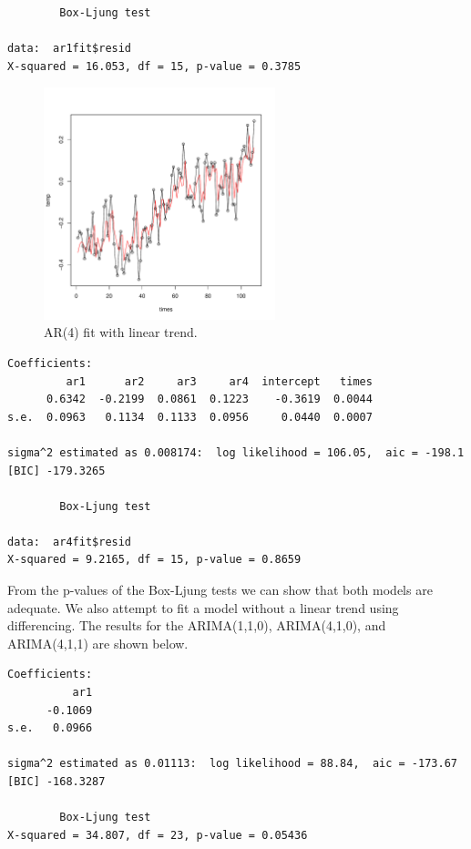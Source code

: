 \documentclass[12pt]{article}
\newenvironment{solution}[2][Solution]{\begin{trivlist}
	\item[\hskip \labelsep {\bfseries #1}]}{\end{trivlist}}
\begin{document}
\begin{solution}{}
\begin{lstlisting}
        Box-Ljung test

data:  ar1fit$resid
X-squared = 16.053, df = 15, p-value = 0.3785
	\end{lstlisting}
	
	\begin{figure}[H]
    		\centering
    		\includegraphics[width=0.6\textwidth]{figs/problem_6/temp_ar4_lin.pdf}
    		\caption{AR(4) fit with linear trend.}
    		\label{fig:temp_ar4_lin}
	\end{figure}
	
	
		\begin{lstlisting}
Coefficients:
         ar1      ar2     ar3     ar4  intercept   times
      0.6342  -0.2199  0.0861  0.1223    -0.3619  0.0044
s.e.  0.0963   0.1134  0.1133  0.0956     0.0440  0.0007

sigma^2 estimated as 0.008174:  log likelihood = 106.05,  aic = -198.1
[BIC] -179.3265

        Box-Ljung test

data:  ar4fit$resid
X-squared = 9.2165, df = 15, p-value = 0.8659
	\end{lstlisting}
	
	From the p-values of the Box-Ljung tests we can show that both models are adequate. We also attempt to fit a model without a linear trend using differencing. The results for the ARIMA(1,1,0), ARIMA(4,1,0), and ARIMA(4,1,1) are shown below.	
	
	\begin{lstlisting}
Coefficients:
          ar1
      -0.1069
s.e.   0.0966

sigma^2 estimated as 0.01113:  log likelihood = 88.84,  aic = -173.67
[BIC] -168.3287

        Box-Ljung test
X-squared = 34.807, df = 23, p-value = 0.05436
	

\end{lstlisting}
\end{solution}
\end{document}
